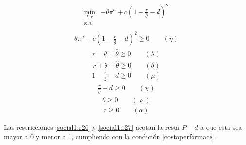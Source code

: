 \begin{equation}
\begin{array}{rrclcl}
\displaystyle \min_{\theta,r} & -\theta \pi^a + c(1-\frac{r}{\hat{\theta}}-d)^2 \\\textrm{s.a.} \label{fo:social2}\\
\end{array}
\end{equation}
\begin{equation}
\begin{array}{rrclcl}
\displaystyle \theta \pi^a - c(1-\frac{r}{\hat{\theta}}-d)^2 \geq 0 \qquad (\eta)\label{social1:r12}
\end{array}
\end{equation}
\begin{equation}
\begin{array}{rrclcl}
\displaystyle r - \theta + \hat{\theta} \geq 0 \qquad (\lambda)\label{social1:r22}
\end{array}
\end{equation}
\begin{equation}
\begin{array}{rrclcl}
\displaystyle r + \theta - \hat{\theta} \geq 0 \qquad (\delta)\label{social1:r23}
\end{array}
\end{equation}
\begin{equation}
\begin{array}{rrclcl}
1-\frac{r}{\hat{\theta}}-d \geq 0 \qquad (\mu)\label{social1:r26}
\end{array}
\end{equation}
\begin{equation}
\begin{array}{rrclcl}
\frac{r}{\hat{\theta}} + d \geq 0 \qquad (\chi)\label{social1:r27}
\end{array}
\end{equation}
\begin{equation}
\begin{array}{rrclcl}
\theta \geq 0 \qquad (\varrho)\label{social1:r24}
\end{array}
\end{equation}
\begin{equation}
\begin{array}{rrclcl}
r \geq 0 \qquad (\alpha)\label{social1:r25}
\end{array}
\end{equation}
\vspace{2.5mm}

Las restricciones \ref{social1:r26} y \ref{social1:r27} acotan la resta $P-d$ a que esta sea mayor a 0 y menor a 1, cumpliendo con la condición \ref{costoperformace}. 
\vspace{2.5mm}

